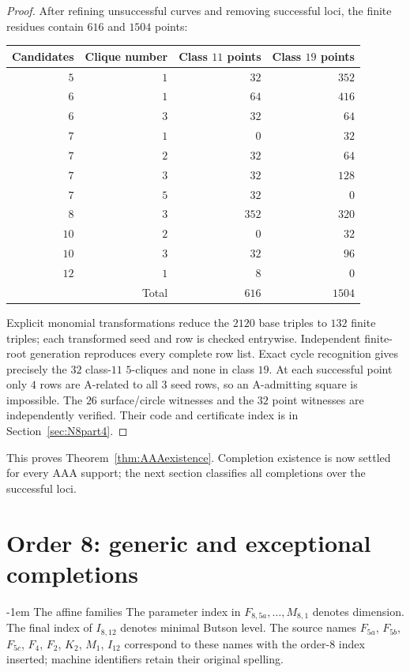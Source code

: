 \documentclass[11pt,a4paper]{article}
\makeatletter
\theoremstyle{plain}
\theoremstyle{definition}
\numberwithin{equation}{section}
\renewcommand\subsection{\@startsection{subsection}{2}{\z@}  {\medskipamount}  {-1em}  {\normalfont\normalsize\bfseries}}
\makeatother
\begin{document}
\begin{proof}
After refining unsuccessful curves and removing successful loci, the finite residues contain $616$ and $1504$ points:
\begin{center}\begin{tabular}{rrrr}\toprule
Candidates&Clique number&Class $11$ points&Class $19$ points\\\midrule
$5$&$1$&$32$&$352$\\$6$&$1$&$64$&$416$\\$6$&$3$&$32$&$64$\\
$7$&$1$&$0$&$32$\\$7$&$2$&$32$&$64$\\$7$&$3$&$32$&$128$\\$7$&$5$&$32$&$0$\\
$8$&$3$&$352$&$320$\\$10$&$2$&$0$&$32$\\$10$&$3$&$32$&$96$\\$12$&$1$&$8$&$0$\\\midrule
\multicolumn{2}{r}{Total}&$616$&$1504$\\\bottomrule
\end{tabular}\end{center}
Explicit monomial transformations reduce the $2120$ base triples to $132$ finite triples; each transformed seed and row is checked entrywise. Independent finite-root generation reproduces every complete row list. Exact cycle recognition gives precisely the $32$ class-$11$ $5$-cliques and none in class $19$. At each successful point only $4$ rows are A-related to all $3$ seed rows, so an A-admitting square is impossible. The $26$ surface/circle witnesses and the $32$ point witnesses are independently verified. Their code and certificate index is in Section~\ref{sec:N8part4}.
\end{proof}
This proves Theorem~\ref{thm:AAAexistence}. Completion existence is now settled for every AAA support; the next section classifies all completions over the successful loci.

\section{Order 8: generic and exceptional completions}\label{sec:N8part2}
\subsection{The affine families}\label{sec:square_scope}\label{sec:families}\label{sec:invariants}
The parameter index in $F_{8,5a},\ldots,M_{8,1}$ denotes dimension. The final index of $I_{8,12}$ denotes minimal Butson level. The source names $F_{5a}$, $F_{5b}$, $F_{5c}$, $F_4$, $F_2$, $K_2$, $M_1$, $I_{12}$ correspond to these names with the order-$8$ index inserted; machine identifiers retain their original spelling.
\end{document}
